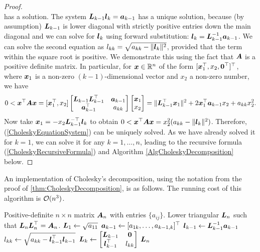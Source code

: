 \begin{proof}
\begin{equation}
	\end{equation}
	has a solution. The system \(\boldsymbol{L}_{k-1} \boldsymbol{l}_k = \boldsymbol{a}_{k-1}\) has a unique solution, because (by assumption) \(\boldsymbol{L}_{k-1}\) is lower diagonal with strictly positive entries down the main diagonal and we can solve for \(\boldsymbol{l}_k\) using forward substitution: \(\boldsymbol{l}_k = \boldsymbol{L}_{k-1}^{-1} \boldsymbol{a}_{k-1}\). We can solve the second equation as \(l_{kk} = \sqrt{a_{kk} - \|\boldsymbol{l}_k\|^2}\), provided that the term within the square root is positive. We demonstrate this using the fact that \(\boldsymbol{A}\) is a positive definite matrix. In particular, for \(\boldsymbol{x} \in \mathbb{R}^n\) of the form \([\boldsymbol{x}_1^\top, x_2, \boldsymbol{0}^\top]^\top\), where \(\boldsymbol{x}_1\) is a non-zero \((k-1)\)-dimensional vector and \(x_2\) a non-zero number, we have
	\begin{equation}
		\label{PositiveDefiniteCheck}
		0 < \boldsymbol{x}^\top \boldsymbol{A} \boldsymbol{x} = [\boldsymbol{x}_1^\top, x_2] \begin{bmatrix} \boldsymbol{L}_{k-1}\boldsymbol{L}_{k-1}^\top & \boldsymbol{a}_{k-1} \\ \boldsymbol{a}_{k-1}^\top & a_{kk} \end{bmatrix} \begin{bmatrix} \boldsymbol{x}_1 \\ x_2 \end{bmatrix} = \|\boldsymbol{L}_{k-1}^\top \boldsymbol{x}_1\|^2 + 2\boldsymbol{x}_1^\top \boldsymbol{a}_{k-1} x_2 + a_{kk} x_2^2.
	\end{equation}
	Now take \(\boldsymbol{x}_1 = -x_2 \boldsymbol{L}_{k-1}^{-\top} \boldsymbol{l}_k\) to obtain \(0 < \boldsymbol{x}^\top \boldsymbol{A} \boldsymbol{x} = x_2^2 (a_{kk} - \|\boldsymbol{l}_k\|^2)\). Therefore, (\ref{CholeskyEquationSystem}) can be uniquely solved. As we have already solved it for \(k=1\), we can solve it for any \(k=1, \dots, n\), leading to the recursive formula (\ref{CholeskyRecursiveFormula}) and Algorithm \ref{AlgCholeskyDecomposition} below.
\end{proof}

An implementation of Cholesky's decomposition, using the notation from the proof of \ref{thm:CholeskyDecomposition}, is as follows. The running cost of this algorithm is \(\mathcal{O}(n^3)\).

\begin{algorithm}[H]
	\caption{Cholesky Decomposition}
	\label{AlgCholeskyDecomposition}
	\begin{algorithmic}[1]
		\Require Positive-definite \(n \times n\) matrix \(\boldsymbol{A}_n\) with entries \(\{a_{ij}\}\).
		\Ensure Lower triangular \(\boldsymbol{L}_n\) such that \(\boldsymbol{L}_n\boldsymbol{L}_n^\top = \boldsymbol{A}_n\).
		\State \(\boldsymbol{L}_1 \leftarrow \sqrt{a_{11}}\)
		\State \(\boldsymbol{a}_{k-1} \leftarrow [a_{1k}, \dots, a_{k-1,k}]^\top\)
		\State \(\boldsymbol{l}_{k-1} \leftarrow \boldsymbol{L}_{k-1}^{-1} \boldsymbol{a}_{k-1}\)
		\State \(l_{kk} \leftarrow \sqrt{a_{kk} - \boldsymbol{l}_{k-1}^\top \boldsymbol{l}_{k-1}}\)
		\State \(\boldsymbol{L}_k \leftarrow \begin{bmatrix} \boldsymbol{L}_{k-1} & \boldsymbol{0} \\ \boldsymbol{l}_{k-1}^\top & l_{kk} \end{bmatrix}\)
		\EndFor
		\State \Return \(\boldsymbol{L}_n\)
	\end{algorithmic}
\end{algorithm}

